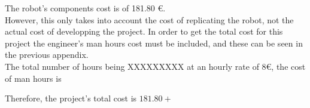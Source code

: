 The robot's components cost is of 181.80 \euro. \\

However, this only takes into account the cost of replicating the robot, not the actual cost of developping the project. In order to get the total cost for this project the engineer's man hours cost must be included, and these can be seen in the previous appendix. \\

The total number of hours being XXXXXXXXX at an hourly rate of 8\euro, the cost of man hours is 

Therefore, the project's total cost is $181.80+$